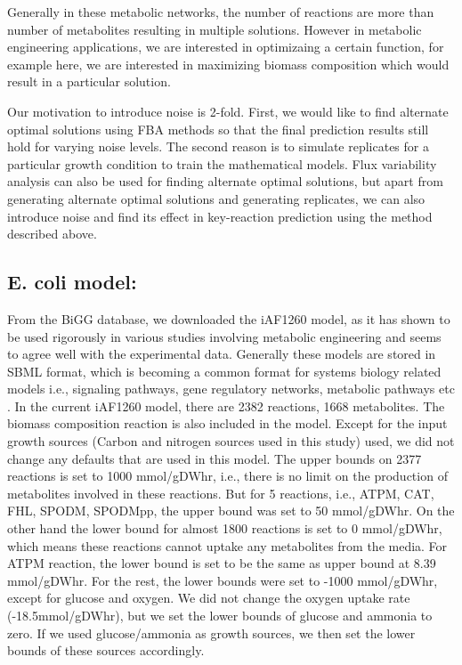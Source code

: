 \documentclass[12pt]{article}
\begin{document}
Generally in these metabolic networks, the number of reactions are more than number of metabolites resulting in multiple solutions.  However in metabolic engineering applications, we are interested in optimizaing a certain function, for example here, we are interested in maximizing biomass composition which would result in a particular solution. 

Our motivation to introduce noise is 2-fold. First, we would like to find alternate optimal solutions using FBA methods so that the final prediction results still hold for varying noise levels. The second reason is to simulate replicates for a particular growth condition to train the mathematical models. Flux variability analysis can also be used for finding alternate optimal solutions, but apart from generating alternate optimal solutions and generating replicates, we can also introduce noise and find its effect in key-reaction prediction using the method described above.

\subsection*{E. coli model:} 
From the BiGG database, we downloaded the iAF1260 model, as it has shown to be used rigorously in various studies involving metabolic engineering and seems to agree well with the experimental data. Generally these models are stored in SBML format, which is becoming a common format for systems biology related models i.e., signaling pathways, gene regulatory networks, metabolic pathways etc \cite{Huckaetal2003}. In the current iAF1260 model, there are 2382 reactions, 1668 metabolites. The biomass composition reaction is also included in the model. Except for the input growth sources (Carbon and nitrogen sources used in this study) used, we did not change any defaults that are used in this model. The upper bounds on 2377 reactions is set to 1000 mmol/gDWhr, i.e., there is no limit on the production of metabolites involved in these reactions. But for 5 reactions, i.e., ATPM, CAT, FHL, SPODM, SPODMpp, the upper bound was set to 50 mmol/gDWhr. On the other hand the lower bound for almost 1800 reactions is set to 0 mmol/gDWhr, which means these reactions cannot uptake any metabolites from the media. For ATPM reaction, the lower bound is set to be the same as upper bound at 8.39 mmol/gDWhr. For the rest, the lower bounds were set to -1000 mmol/gDWhr, except for glucose and oxygen. We did not change the oxygen uptake rate (-18.5mmol/gDWhr), but we set the lower bounds of glucose and ammonia to zero. If we used glucose/ammonia as growth sources, we then set the lower bounds of these sources accordingly.
\end{document}
